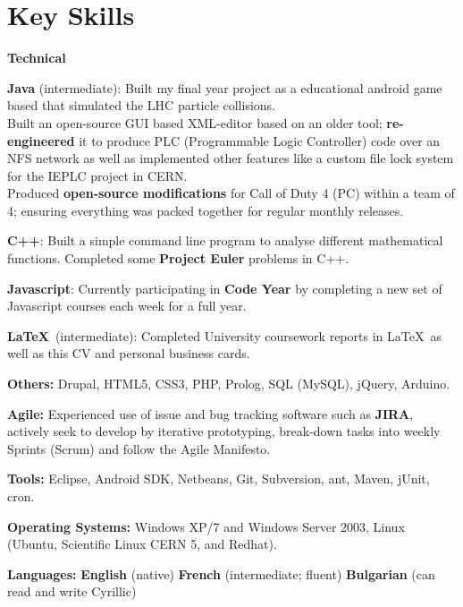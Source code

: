 \documentclass[final,a4paper,notitlepage,10pt]{article}
\begin{document}
\section*{Key Skills {\hfill\raisebox{.5ex}{\makebox[.65\textwidth]{\hrulefill}}}}
{\bf Technical}
\vspace*{-0.5\baselineskip}
\begin{compactitemize}
	\item \textbf{Java} (intermediate): Built my final year project as a educational android game based that simulated the LHC particle collisions.\\
	Built an open-source GUI based XML-editor based on an older tool; \textbf{re-engineered} it to produce PLC (Programmable Logic Controller) code over an NFS network as well as implemented other features like a custom file lock system for the IEPLC project in CERN.\\
	Produced \textbf{open-source modifications} for Call of Duty 4 (PC) within a team of 4; ensuring everything was packed together for regular monthly releases.
	\item \textbf{C++}: Built a simple command line program to analyse different mathematical functions. Completed some \textbf{Project Euler} problems in C++.
	\item \textbf{Javascript}: Currently participating in \textbf{Code Year} by completing a new set of Javascript courses each week for a full year.
	\item \textbf{\LaTeX}\ (intermediate): Completed University coursework reports in \LaTeX\ as well as this CV and personal business cards.
	\item \textbf{Others:} Drupal, HTML5, CSS3, PHP, Prolog, SQL (MySQL), jQuery, Arduino.
	\item \textbf{Agile:} Experienced use of issue and bug tracking software such as \textbf{JIRA}, actively seek to develop by iterative prototyping, break-down tasks into weekly Sprints (Scrum) and follow the Agile Manifesto.
	\item \textbf{Tools:} Eclipse, Android SDK, Netbeans, Git, Subversion, ant, Maven, jUnit, cron.
	\item \textbf{Operating Systems:} Windows XP/7 and Windows Server 2003, Linux (Ubuntu, Scientific Linux CERN 5, and Redhat).
\end{compactitemize}

{\bf Languages:} \qquad \textbf{English} (native) \quad \textbf{French} (intermediate; fluent) \quad \textbf{Bulgarian} (can read and write Cyrillic)
\end{document}
